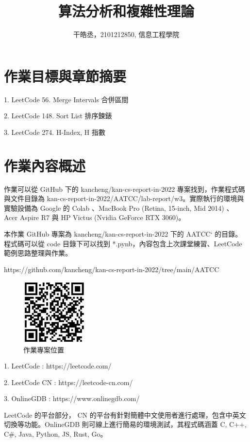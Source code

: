 \documentclass[10pt,UTF8]{ctexart}
\title{算法分析和複雜性理論}
\author{干皓丞，2101212850, 信息工程學院}
\begin{document}
\maketitle


\section{作業目標與章節摘要}

1. LeetCode 56. Merge Intervals 合併區間

2. LeetCode 148. Sort List 排序鍊錶

3. LeetCode 274. H-Index, H 指數


\section{作業內容概述}

作業可以從 GitHub 下的 kancheng/kan-cs-report-in-2022 專案找到，作業程式碼與文件目錄為 kan-cs-report-in-2022/AATCC/lab-report/w3。實際執行的環境與實驗設備為 Google 的 Colab 、MacBook Pro (Retina, 15-inch, Mid 2014) 、 Acer Aspire R7 與 HP Victus (Nvidia GeForce RTX 3060)。

本作業 GitHub 專案為 kancheng/kan-cs-report-in-2022 下的 AATCC` 的目錄。程式碼可以從 code 目錄下可以找到 *.pynb，內容包含上次課堂練習、LeetCode 範例思路整理與作業。

https://github.com/kancheng/kan-cs-report-in-2022/tree/main/AATCC

\begin{figure}[H]
\centering 
\includegraphics[width=0.30\textwidth]{aatccqr.png} 
\caption{作業專案位置}
\label{Test}
\end{figure}


1. LeetCode : https://leetcode.com/

2. LeetCode CN : https://leetcode-cn.com/

3. OnlineGDB : https://www.onlinegdb.com/ 

LeetCode 的平台部分， CN 的平台有針對簡體中文使用者進行處理，包含中英文切換等功能。OnlineGDB 則可線上進行簡易的環境測試，其程式碼涵蓋 C, C++, C\#, Java, Python, JS, Rust, Go。
\end{document}
